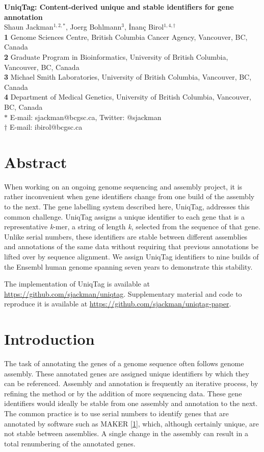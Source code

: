 \documentclass[10pt]{article}
\date{}
\begin{document}
\begin{flushleft}
{\large
\textbf{UniqTag: Content-derived unique and stable identifiers for gene annotation}
}
\\
Shaun Jackman$^{1,2,\ast}$,
Joerg Bohlmann$^{3}$,
\.{I}nan\c{c} Birol$^{1,4,\dagger}$
\\ \textbf{1} Genome Sciences Centre, British Columbia Cancer Agency, Vancouver, BC, Canada
\\ \textbf{2} Graduate Program in Bioinformatics, University of British Columbia, Vancouver, BC, Canada
\\ \textbf{3} Michael Smith Laboratories, University of British Columbia, Vancouver, BC, Canada
\\ \textbf{4} Department of Medical Genetics, University of British Columbia, Vancouver, BC, Canada
\\ $\ast$ E-mail: sjackman@bcgsc.ca, Twitter: @sjackman
\\ $\dagger$ E-mail: ibirol@bcgsc.ca
\end{flushleft}
\section{Abstract}\label{abstract}

When working on an ongoing genome sequencing and assembly project, it is
rather inconvenient when gene identifiers change from one build of the
assembly to the next. The gene labelling system described here, UniqTag,
addresses this common challenge. UniqTag assigns a unique identifier to
each gene that is a representative \emph{k}-mer, a string of length
\emph{k}, selected from the sequence of that gene. Unlike serial
numbers, these identifiers are stable between different assemblies and
annotations of the same data without requiring that previous annotations
be lifted over by sequence alignment. We assign UniqTag identifiers to
nine builds of the Ensembl human genome spanning seven years to
demonstrate this stability.

The implementation of UniqTag is available at
\url{https://github.com/sjackman/uniqtag}. Supplementary material and
code to reproduce it is available at
\url{https://github.com/sjackman/uniqtag-paper}.

\section{Introduction}\label{introduction}

The task of annotating the genes of a genome sequence often follows
genome assembly. These annotated genes are assigned unique identifiers
by which they can be referenced. Assembly and annotation is frequently
an iterative process, by refining the method or by the addition of more
sequencing data. These gene identifiers would ideally be stable from one
assembly and annotation to the next. The common practice is to use
serial numbers to identify genes that are annotated by software such as
MAKER {[}\href{http://dx.doi.org/10.1104/pp.113.230144}{1}{]}, which,
although certainly unique, are not stable between assemblies. A single
change in the assembly can result in a total renumbering of the
annotated genes.
\end{document}
